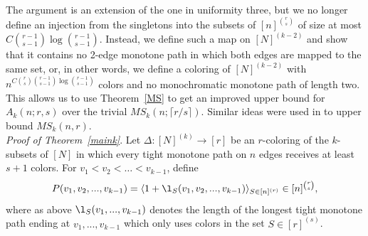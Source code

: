 The argument is an extension of the one in uniformity three, but we no longer define an injection from the singletons into the subsets of $[n]^{\binom{r}{s}}$ of size at most $C \binom{r-1}{s-1} \log \binom{r-1}{s-1}$.
Instead, we define such a map on $[N]^{(k-2)}$ and show that it contains no 2-edge monotone path in which both edges are mapped to the same set, or, in other words, we define a coloring of $[N]^{(k-2)}$ with $n^{C \binom{r}{s} \binom{r-1}{s-1} \log \binom{r-1}{s-1}}$ colors and no monochromatic monotone path of length two.
This allows us to use Theorem~\ref{MS} to get an improved upper bound for $A_k(n;r,s)$ over the trivial $MS_k(n;\lceil r/s \rceil)$.
Similar ideas were used in \cite{FPSS12, MS14} to upper bound $MS_k(n,r)$.\\

\noindent \textit{Proof of Theorem~\ref{maink}}.
    Let $\Delta: [N]^{(k)} \to [r]$ be an $r$-coloring of the $k$-subsets of $[N]$ in which every tight monotone path on $n$ edges receives at least $s+1$ colors.
    For $v_1 < v_2 < \dots < v_{k-1}$, define
    \begin{equation*}
        P(v_1,v_2,...,v_{k-1}) =
            \langle 1 + \l_S(v_1, v_2, ...,v_{k-1})\rangle_{S \in [n]^{(r)}} \in [n]^{\binom{r}{s}},
    \end{equation*}
    where as above $\l_S(v_1,...,v_{k-1})$ denotes the length of the longest tight monotone path ending at $v_1, ..., v_{k-1}$ which only uses colors in the set $S \in [r]^{(s)}$.
    
